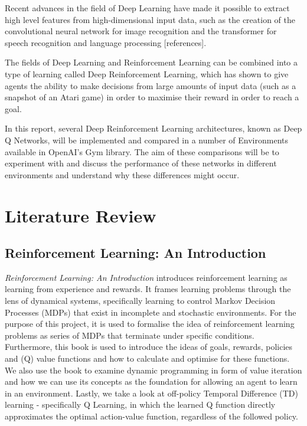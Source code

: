 \documentclass{article}
\begin{document}
Recent advances in the field of Deep Learning have made it possible to extract high level features from high-dimensional input data, such as the creation of the convolutional neural network for image recognition and the transformer for speech recognition and language processing [references].

The fields of Deep Learning and Reinforcement Learning can be combined into a type of learning called Deep Reinforcement Learning, which has shown to give agents the ability to make decisions from large amounts of input data (such as a snapshot of an Atari game) in order to maximise their reward in order to reach a goal\cite{mnih2013atari}. 

In this report, several Deep Reinforcement Learning architectures, known as Deep Q Networks, will be implemented and compared in a number of Environments available in OpenAI's Gym library\cite{brockman2016openai}. The aim of these comparisons will be to experiment with and discuss the performance of these networks in different environments and understand why these differences might occur. 

\newpage

\section{Literature Review}

\subsection{Reinforcement Learning: An Introduction}

\textit{Reinforcement Learning: An Introduction}\cite{Sutton1998} introduces reinforcement learning as learning from experience and rewards. It frames learning problems through the lens of dynamical systems, specifically learning to control Markov Decision Processes (MDPs) that exist in incomplete and stochastic environments. For the purpose of this project, it is used to formalise the idea of reinforcement learning problems as series of MDPs that terminate under specific conditions. Furthermore, this book is used to introduce the ideas of goals, rewards, policies and (Q) value functions and how to calculate and optimise for these functions. We also use the book to examine dynamic programming in form of value iteration and how we can use its concepts as the foundation for allowing an agent to learn in an environment. Lastly, we take a look at off-policy Temporal Difference (TD) learning - specifically Q Learning, in which the learned Q function directly approximates the optimal action-value function, regardless of the followed policy. 
\end{document}
